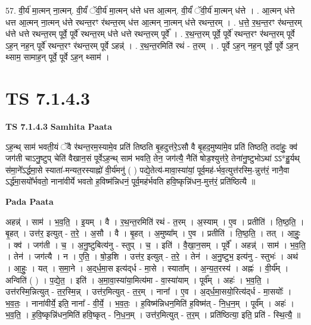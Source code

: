 \documentclass[17pt]{extarticle}
\begin{document}
57. वी॒र्य॑ मा॒त्मन् ना॒त्मन्. वी॒र्यं॑ ॅवी॒र्य॑ मा॒त्मन् ध॑त्ते धत्त आ॒त्मन्. वी॒र्यं॑ ॅवी॒र्य॑ मा॒त्मन् ध॑त्ते । . आ॒त्मन् ध॑त्ते धत्त आ॒त्मन् ना॒त्मन् ध॑त्ते रथन्त॒रꣳ र॑थन्त॒रम् ध॑त्त आ॒त्मन् ना॒त्मन् ध॑त्ते रथन्त॒रम् । . ध॒त्ते॒ र॒थ॒न्त॒रꣳ र॑थन्त॒रम् ध॑त्ते धत्ते रथन्त॒रम् पूर्वे॒ पूर्वे॑ रथन्त॒रम् ध॑त्ते धत्ते रथन्त॒रम् पूर्वे᳚ । . र॒थ॒न्त॒रम् पूर्वे॒ पूर्वे॑ रथन्त॒रꣳ र॑थन्त॒रम् पूर्वे ऽह॒न् नह॒न् पूर्वे॑ रथन्त॒रꣳ र॑थन्त॒रम् पूर्वे ऽहन्न्॑ । . र॒थ॒न्त॒रमिति॑ रथं - त॒रम् । . पूर्वे ऽह॒न् नह॒न् पूर्वे॒ पूर्वे ऽह॒न् थ्साम॒ सामाह॒न् पूर्वे॒ पूर्वे ऽह॒न् थ्साम॑ । \newline
\pagebreak
{}

\section{ TS 7.1.4.3 }

\textbf{TS 7.1.4.3 } \newline
\textbf{Samhita Paata} \newline

ऽह॒न्थ् साम॑ भवती॒यं ॅवै र॑थन्त॒रम॒स्यामे॒व प्रति॑ तिष्ठति बृ॒हदुत्त॑रे॒ऽसौ वै बृ॒हद॒मुष्या॑मे॒व प्रति॑ तिष्ठति॒ तदा॑हुः॒ क्व॑ जग॑ती चाऽनु॒ष्टुप् चेति॑ वैखान॒सं पूर्वेऽह॒न्थ् साम॑ भवति॒ तेन॒ जग॑त्यै॒ नैति॑ षोड॒श्युत्त॑रे॒ तेना॑नु॒ष्टुभोऽथा॑ ऽऽ*हु॒र्यथ् स॑मा॒ने᳚ऽर्द्धमा॒से स्याता॑-मन्यत॒रस्याह्नो॑ वी॒र्य॑मनु॑ ( ) पद्ये॒तेत्य॑-मावा॒स्या॑यां॒ पूर्व॒मह॑-र्भव॒त्युत्त॑रस्मि॒-न्नुत्त॑रं॒ नानै॒वा ऽर्द्ध॑मा॒सयो᳚र्भवतो॒ नाना॑वीर्ये भवतो ह॒विष्म॑न्निधनं॒ पूर्व॒मह॑र्भवति हवि॒ष्कृन्नि॑धन॒-मुत्त॑रं॒ प्रति॑ष्ठित्यै ॥ \newline

\textbf{Pada Paata} \newline

अहन्न्॑ । साम॑ । भ॒व॒ति॒ । इ॒यम् । वै । र॒थ॒न्त॒रमिति॑ रथं - त॒रम् । अ॒स्याम् । ए॒व । प्रतीति॑ । ति॒ष्ठ॒ति॒ । बृ॒हत् । उत्त॑र॒ इत्युत् - त॒रे॒ । अ॒सौ । वै । बृ॒हत् । अ॒मुष्या᳚म् । ए॒व । प्रतीति॑ । ति॒ष्ठ॒ति॒ । तत् । आ॒हुः॒ । क्व॑ । जग॑ती । च॒ । अ॒नु॒ष्टुबित्य॑नु - स्तुप् । च॒ । इति॑ । वै॒खा॒न॒सम् । पूर्वे᳚ । अहन्न्॑ । साम॑ । भ॒व॒ति॒ । तेन॑ । जग॑त्यै । न । ए॒ति॒ । षो॒ड॒शि । उत्त॑र॒ इत्युत् - त॒रे॒ । तेन॑ । अ॒नु॒ष्टुभ॒ इत्य॑नु - स्तुभः॑ । अथ॑ । आ॒हुः॒ । यत् । स॒मा॒ने । अ॒द्‌र्ध॒मा॒स इत्य॑द्‌र्ध - मा॒से । स्याता᳚म् । अ॒न्य॒त॒रस्य॑ । अह्नः॑ । वी॒र्य᳚म् । अन्विति॑ ( ) । प॒द्ये॒त॒ । इति॑ । अ॒मा॒वा॒स्या॑या॒मित्य॑मा - वा॒स्या॑याम् । पूर्व᳚म् । अहः॑ । भ॒व॒ति॒ । उत्त॑रस्मि॒न्नित्युत् - त॒र॒स्मि॒न्न् । उत्त॑र॒मित्युत् - त॒र॒म् । नाना᳚ । ए॒व । अ॒द्‌र्ध॒मा॒सयो॒रित्य॑द्‌र्ध - मा॒सयोः᳚ । भ॒व॒तः॒ । नाना॑वीर्ये॒ इति॒ नाना᳚ - वी॒र्ये॒ । भ॒व॒तः॒ । ह॒विष्म॑न्निधन॒मिति॑ ह॒विष्म॑त् - नि॒ध॒न॒म् । पूर्व᳚म् । अहः॑ । भ॒व॒ति॒ । ह॒वि॒ष्कृन्नि॑धन॒मिति॑ हवि॒ष्कृत् - नि॒ध॒न॒म् । उत्त॑र॒मित्युत् - त॒र॒म् । प्रति॑ष्ठित्या॒ इति॒ प्रति॑ - स्थि॒त्यै॒ ॥  \newline
\end{document}
